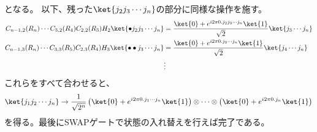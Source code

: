 \documentclass[]{ltjsarticle}
\begin{document}
となる。
以下、残った$\ket{j_2j_3\cdots j_n}$の部分に同様な操作を施す。
\begin{align}
    C_{n-1,2}(R_n)
    \cdots
    C_{3,2}(R_4)
    C_{2,2}(R_3)
    H_2
    \ket{\bullet j_2j_3\cdots j_n}
    &=
    \frac{\ket{0} + e^{i 2\pi 0.j_2j_3\cdots j_n}\ket{1}}{\sqrt{2}}
    \ket{j_3\cdots j_n} \\
    C_{n-1,3}(R_n)
    \cdots
    C_{3,3}(R_5)
    C_{2,3}(R_4)
    H_3
    \ket{\bullet\bullet j_3\cdots j_n}
    &=
    \frac{\ket{0} + e^{i 2\pi 0.j_3\cdots j_n}\ket{1}}{\sqrt{2}}
    \ket{j_4\cdots j_n} \\
    & \vdots
\end{align}
これらをすべて合わせると、
\begin{align}
    \ket{j_1j_2 \cdots j_n}
    \to
    \frac{1}{\sqrt{2^n}}
    \left(
        \ket{0} 
        + 
        e^{i2\pi 0.j_1 \cdots j_n} \ket{1}
    \right)
    \otimes 
    \cdots 
    \otimes 
    \left(
        \ket{0} 
        + 
        e^{i2\pi 0.j_n} \ket{1}
    \right)
\end{align}
を得る。最後にSWAPゲートで状態の入れ替えを行えば完了である。
\end{document}
